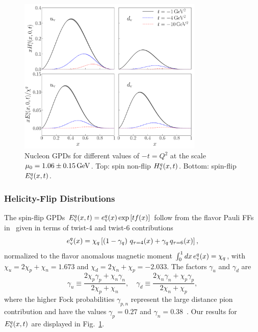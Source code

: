\documentclass[aps,prl,reprint,groupedaddress, preprintnumbers]{revtex4-1}
\def\be{\begin{equation}}
\def\ee{\end{equation}}
\begin{document}
\begin{figure}[htbp] 
\begin{center} 
\includegraphics[width=8.8cm]{proton_gpds}
\setlength\abovecaptionskip{-4pt}
\setlength\belowcaptionskip{-6pt}
\caption{\label{GPDs} Nucleon GPDs for different values of $- t =  Q^2$  at the scale $\mu_0=1.06\pm0.15\,\rm GeV$. Top: spin non-flip $H^q_{\rm v}(x,t)$. Bottom: spin-flip $E^q_{\rm v}(x,t)$.}
\end{center}
\end{figure}


\subsubsection{Helicity-Flip Distributions}


The spin-flip GPDs $E^q_{\rm v}(x,t) = e^q_{\rm v}(x) \exp \left[t f(x)\right]$ follow from the flavor Pauli FFs in~\cite{Sufian:2016hwn} given in terms of twist-4 and twist-6 contributions
\be
e^q_{\rm v}(x) = \chi_q \left[\left(1 - \gamma_q \right) \,q_{\tau=4}(x) + \gamma_q \, q_{\tau=6}(x) \right],
\ee
normalized to the flavor anomalous magnetic moment $ \int_0^1 dx \, e^q_{\rm v}(x) = \chi_q$, with $\chi_u= 2 \chi_p + \chi_n = 1.673$ and $\chi_d =   2 \chi_n +\chi_p = -2.033$. The factors $\gamma_u$ and $\gamma_d$ are
\be
\gamma_u \equiv \frac{2 \chi_p \gamma_p + \chi_n \gamma_n}{2 \chi_p + \chi_n}, \quad 
\gamma_d \equiv \frac{2 \chi_n \gamma_n + \chi_p \gamma_p}{2 \chi_n + \chi_p}, 
\ee
where the higher Fock probabilities $\gamma_{p,n}$ represent the large distance pion contribution and have the values $\gamma_p=0.27$ and $\gamma_n=0.38$~\cite{Sufian:2016hwn}. Our results for $E^q_{\rm v}(x,t)$ are displayed in Fig.~\ref{GPDs}. 
\end{document}
